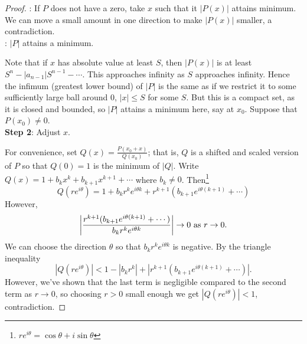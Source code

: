 \begin{proof}

: If $ P$ does not have a zero, take $x$ such that it $ |P(x)|$ attains minimum. We can move a small amount in one direction to make $|P(x)|$ smaller, a contradiction.\\

: $|P|$ attains a minimum.

Note that if $ x$ has absolute value at least $ S$, then $ |P(x)|$ is at least $ S^n-|a_{n-1}|S^{n-1}-\cdots $. This approaches infinity as $ S$ approaches infinity. Hence the infimum (greatest lower bound) of $|P|$ is the same as if we restrict it to some sufficiently large ball around 0, $|x|\leq S$ for some $ S$. But this is a compact set, as it is closed and bounded, so $ |P|$ attains a minimum here, say at $x_0$. Suppose that $ P(x_0)\neq 0$.\\

\noindent\textbf{Step 2}: Adjust $ x$.

For convenience, set $ Q(x)=\frac{P(x_0+x)}{Q(x_0)}$; that is, $ Q$ is a shifted and scaled version of $ P$ so that $ Q(0)=1$ is the minimum of $ |Q|$. Write $ Q(x)=1+b_kx^k+b_{k+1}x^{k+1}+\cdots$ where $ b_k\neq 0$. Then\footnote{$re^{i\theta}=\cos\theta+i\sin \theta$}
\[Q(re^{i\theta})=1+b_kr^ke^{i\theta k}+r^{k+1}(b_{k+1}e^{i\theta(k+1)}+\cdots)\]
However,
\[
\left| {\frac{r^{k+1}(b_{k+1}e^{i\theta(k+1)}+\cdots)}{b_kr^ke^{i\theta k}}} \right|\to 0\text{ as }r\to 0.
\]
We can choose the direction $ \theta$ so that $b_kr^ke^{i\theta k}$ is negative. 
By the triangle inequality 
\[|Q(re^{i\theta})|<1-|b_kr^k|+|r^{k+1}(b_{k+1}e^{i\theta(k+1)}+\cdots)|.\]
However, we've shown that the last term is negligible compared to the second term as $r\to 0$, so choosing $ r>0$ small enough we get $|Q(re^{i\theta})|<1$, contradiction.
\end{proof}

